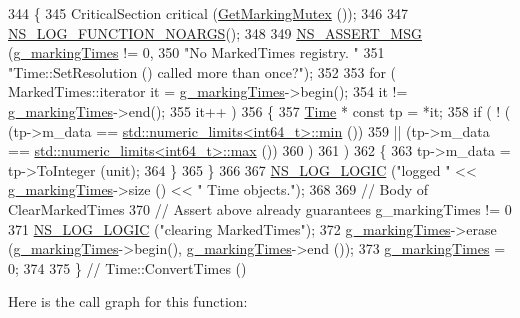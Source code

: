 \begin{DoxyCode}
344 \{
345   CriticalSection critical (\hyperlink{namespacens3_ac4356aa982bd2ddb0f7ebbf94539919d}{GetMarkingMutex} ());
346 
347   \hyperlink{log-macros-disabled_8h_a8f7e4afc291c9d29a65c18ac1f79197b}{NS\_LOG\_FUNCTION\_NOARGS}();
348 
349   \hyperlink{assert_8h_aff5ece9066c74e681e74999856f08539}{NS\_ASSERT\_MSG} (\hyperlink{classns3_1_1Time_aa01dcd3b61742fd80eedd17834497ab7}{g\_markingTimes} != 0,
350                  \textcolor{stringliteral}{"No MarkedTimes registry. "}
351                  \textcolor{stringliteral}{"Time::SetResolution () called more than once?"});
352 
353   \textcolor{keywordflow}{for} ( MarkedTimes::iterator it = \hyperlink{classns3_1_1Time_aa01dcd3b61742fd80eedd17834497ab7}{g\_markingTimes}->begin();
354         it != \hyperlink{classns3_1_1Time_aa01dcd3b61742fd80eedd17834497ab7}{g\_markingTimes}->end();
355         it++ )
356     \{
357       \hyperlink{classns3_1_1Time_a8a39dc1b8cbbd7fe6d940e492d1b925e}{Time} * \textcolor{keyword}{const} tp = *it;
358       \textcolor{keywordflow}{if} ( ! (    (tp->m\_data == \hyperlink{80211b_8c_ac6afabdc09a49a433ee19d8a9486056d}{std::numeric\_limits<int64\_t>::min} ())
359                || (tp->m\_data == \hyperlink{80211b_8c_affe776513b24d84b39af8ab0930fef7f}{std::numeric\_limits<int64\_t>::max} ())
360              )
361          )
362         \{
363       tp->m\_data = tp->ToInteger (unit);
364     \}
365     \}
366 
367   \hyperlink{group__logging_ga88acd260151caf2db9c0fc84997f45ce}{NS\_LOG\_LOGIC} (\textcolor{stringliteral}{"logged "} << \hyperlink{classns3_1_1Time_aa01dcd3b61742fd80eedd17834497ab7}{g\_markingTimes}->size () << \textcolor{stringliteral}{" Time objects."});
368 
369   \textcolor{comment}{// Body of ClearMarkedTimes}
370   \textcolor{comment}{// Assert above already guarantees g\_markingTimes != 0}
371   \hyperlink{group__logging_ga88acd260151caf2db9c0fc84997f45ce}{NS\_LOG\_LOGIC} (\textcolor{stringliteral}{"clearing MarkedTimes"});
372   \hyperlink{classns3_1_1Time_aa01dcd3b61742fd80eedd17834497ab7}{g\_markingTimes}->erase (\hyperlink{classns3_1_1Time_aa01dcd3b61742fd80eedd17834497ab7}{g\_markingTimes}->begin(), 
      \hyperlink{classns3_1_1Time_aa01dcd3b61742fd80eedd17834497ab7}{g\_markingTimes}->end ());
373   \hyperlink{classns3_1_1Time_aa01dcd3b61742fd80eedd17834497ab7}{g\_markingTimes} = 0;
374 
375 \}  \textcolor{comment}{// Time::ConvertTimes ()}
\end{DoxyCode}


Here is the call graph for this function\+:




